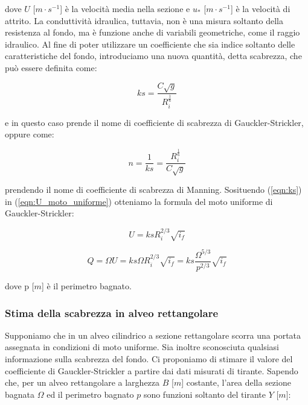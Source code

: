 \documentclass[12pt]{article} %
\begin{document}
\noindent dove $U$ [$m\cdot s^{-1}$] è la velocità media nella sezione e $u_*$ [$m\cdot s^{-1}$] è la velocità di attrito. La conduttività idraulica, tuttavia, non è una misura soltanto della resistenza al fondo, ma è funzione anche di variabili geometriche, come il raggio idraulico. Al fine di poter utilizzare un coefficiente che sia indice soltanto delle caratteristiche del fondo, introduciamo una nuova quantità, detta scabrezza, che può essere definita come:

\begin{equation}
    ks=\frac{C\sqrt{g}}{R_i^\frac{1}{6}}
    \label{eqn:ks}
\end{equation}

\noindent e in questo caso prende il nome di coefficiente di scabrezza di Gauckler-Strickler, oppure come:

\begin{equation}
    n=\frac{1}{ks}=\frac{R_i^\frac{1}{6}}{C\sqrt{g}}
    \label{eqn:n_Manning}
\end{equation}

\noindent prendendo il nome di coefficiente di scabrezza di Manning. Sosituendo (\ref{eqn:ks}) in (\ref{eqn:U_moto_uniforme}) otteniamo la formula del moto uniforme di Gauckler-Strickler:

\begin{equation}
    U=ksR_i^{2/3}\sqrt{i_f}
    \label{eqn:U_Gauckler-Strickler}
\end{equation}

\begin{equation}
    Q= \Omega U = ks\Omega R_i^{2/3}\sqrt{i_f} =ks\frac{\Omega^{5/3}}{p^{2/3}}\sqrt{i_f}
    \label{eqn:Q_Gauckler-Strickler}
\end{equation}

\noindent dove p [$m$] è il perimetro bagnato.

\subsubsection{Stima della scabrezza in alveo rettangolare}

\noindent Supponiamo che in un alveo cilindrico a sezione rettangolare scorra una portata assegnata in condizioni di moto uniforme. Sia inoltre sconosciuta qualsiasi informazione sulla scabrezza del fondo. Ci proponiamo di stimare il valore del coefficiente di Gauckler-Strickler a partire dai dati misurati di tirante. Sapendo che, per un alveo rettangolare a larghezza $B$ [$m$] costante, l'area della sezione bagnata $\Omega$ ed il perimetro bagnato $p$ sono funzioni soltanto del tirante $Y$ [$m$]:
\end{document}
